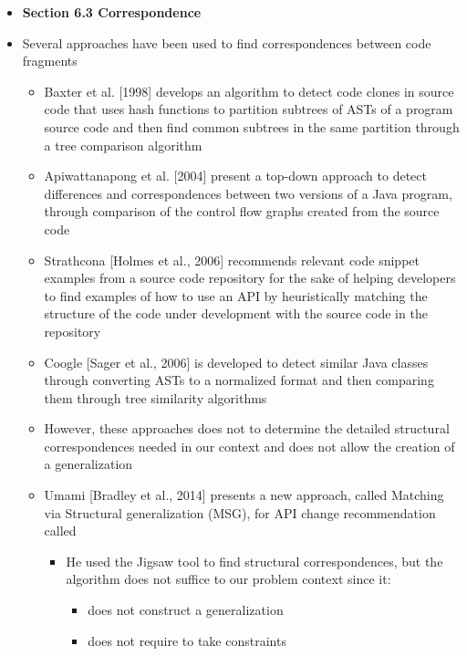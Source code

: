 \documentclass{article}
\newcommand{\bold}{\textbf}
\begin{document}
\begin{itemize} [leftmargin=.1in]
\begin{itemize}
\end{itemize}

\item \bold{Section 6.3 Correspondence}
\item Several approaches have been used to find correspondences between code fragments
\begin{itemize}
\item Baxter et al. [1998] develops an algorithm to detect code clones in source code that uses hash functions to partition subtrees of ASTs of a program source code and then find common subtrees in the same partition through a tree comparison algorithm
\item Apiwattanapong et al. [2004] present a top-down approach to detect differences and correspondences between two versions of a Java program, through comparison of the control flow graphs created from the source code
\item Strathcona [Holmes et al., 2006] recommends relevant code snippet examples from a source code repository for the sake of helping developers to find examples of how to use an API by heuristically matching the structure of the code under
development with the source code in the repository
\item Coogle [Sager et al., 2006] is developed to detect similar Java classes through converting ASTs to a normalized format and then comparing them through tree similarity algorithms
\item However, these approaches does not to determine the detailed structural correspondences needed in our context and does not allow the creation of a generalization
\item Umami [Bradley et al., 2014] presents a new approach, called Matching via Structural generalization (MSG), for API change recommendation called
\begin{itemize}
\item He used the Jigsaw tool to find structural correspondences, but the algorithm does not suffice to our problem context since it:
\begin{itemize}
\item does not construct a generalization
\item does not require to take constraints
\end{itemize}
\end{itemize}
\end{itemize}



\end{itemize}
\end{document}
